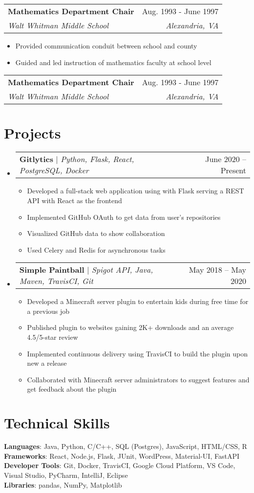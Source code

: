 \documentclass[letterpaper,11pt]{article}
\makeatletter
\newcommand{\resumeItem}[1]{
  \item\small{
    {#1 \vspace{-2pt}}
  }
}
\newcommand{\resumeSubheading}[4]{
  \vspace{-2pt}\item
    \begin{tabular*}{0.97\textwidth}[t]{l@{\extracolsep{\fill}}r}
      \textbf{#1} & #2 \\
      \textit{\small#3} & \textit{\small #4} \\
    \end{tabular*}\vspace{-7pt}
}
\newcommand{\resumeProjectHeading}[2]{
    \item
    \begin{tabular*}{0.97\textwidth}{l@{\extracolsep{\fill}}r}
      \small#1 & #2 \\
    \end{tabular*}\vspace{-7pt}
}
\newcommand{\resumeSubHeadingListStart}{\begin{itemize}[leftmargin=0.15in, label={}]}
\newcommand{\resumeSubHeadingListEnd}{\end{itemize}}
\newcommand{\resumeItemListStart}{\begin{itemize}}
\newcommand{\resumeItemListEnd}{\end{itemize}\vspace{-5pt}}
\makeatother
\begin{document}
  \resumeSubheading
      {Mathematics Department Chair}{Aug. 1993 - June 1997}
      {Walt Whitman Middle School}{Alexandria, VA}
      \resumeItemListStart
      \resumeItem{Provided communication conduit between school and county}
      \resumeItem{Guided and led instruction of mathematics faculty at school level}
    \resumeSubHeadingListEnd

  \resumeSubheading
      {Mathematics Department Chair}{Aug. 1993 - June 1997}
      {Walt Whitman Middle School}{Alexandria, VA}

\section{Projects}
    \resumeSubHeadingListStart
      \resumeProjectHeading
          {\textbf{Gitlytics} $|$ \emph{Python, Flask, React, PostgreSQL, Docker}}{June 2020 -- Present}
          \resumeItemListStart
            \resumeItem{Developed a full-stack web application using with Flask serving a REST API with React as the frontend}
            \resumeItem{Implemented GitHub OAuth to get data from user’s repositories}
            \resumeItem{Visualized GitHub data to show collaboration}
            \resumeItem{Used Celery and Redis for asynchronous tasks}
          \resumeItemListEnd
      \resumeProjectHeading
          {\textbf{Simple Paintball} $|$ \emph{Spigot API, Java, Maven, TravisCI, Git}}{May 2018 -- May 2020}
          \resumeItemListStart
            \resumeItem{Developed a Minecraft server plugin to entertain kids during free time for a previous job}
            \resumeItem{Published plugin to websites gaining 2K+ downloads and an average 4.5/5-star review}
            \resumeItem{Implemented continuous delivery using TravisCI to build the plugin upon new a release}
            \resumeItem{Collaborated with Minecraft server administrators to suggest features and get feedback about the plugin}
          \resumeItemListEnd
    \resumeSubHeadingListEnd



%
\section{Technical Skills}
 \begin{itemize}[leftmargin=0.15in, label={}]
    \small{\item{
     \textbf{Languages}{: Java, Python, C/C++, SQL (Postgres), JavaScript, HTML/CSS, R} \\
     \textbf{Frameworks}{: React, Node.js, Flask, JUnit, WordPress, Material-UI, FastAPI} \\
     \textbf{Developer Tools}{: Git, Docker, TravisCI, Google Cloud Platform, VS Code, Visual Studio, PyCharm, IntelliJ, Eclipse} \\
     \textbf{Libraries}{: pandas, NumPy, Matplotlib}
    }}
 \end{itemize}


\end{document}
